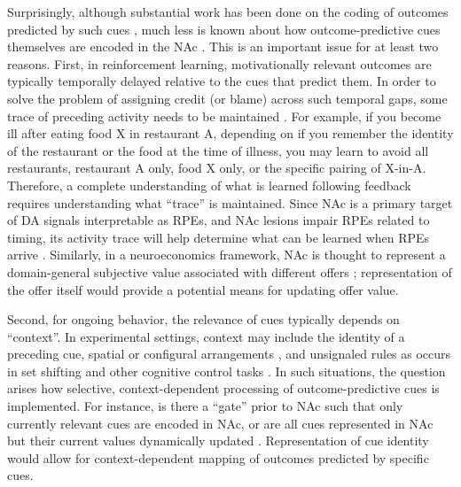 \documentclass[11pt]{article}
\let\cite=\citep
\begin{document}
Surprisingly, although substantial work has been done on the coding of
outcomes predicted by such cues
\cite{Schultz1992,Hollerman1998,Hassani2001,Cromwell2003,Setlow2003,Nicola2004,Roitman2005,Day2006,Roesch2009a,Saddoris2011,Goldstein2012,Lansink2012,Bissonette2013,McGinty2013,Atallah2014,Sugam2014,Cooch2015,West2016},
much less is known about how outcome-predictive cues themselves are
encoded in the NAc \cite[but see;][]{Sleezer2016}. This is an
important issue for at least two reasons. First, in reinforcement
learning, motivationally relevant outcomes are typically temporally
delayed relative to the cues that predict them. In order to solve the
problem of assigning credit (or blame) across such temporal gaps, some
trace of preceding activity needs to be maintained
\cite{sutton1998,Lee2012}. For example, if you become ill after eating
food X in restaurant A, depending on if you remember the identity of
the restaurant or the food at the time of illness, you may learn to
avoid all restaurants, restaurant A only, food X only, or the specific
pairing of X-in-A. Therefore, a complete understanding of what is
learned following feedback requires understanding what “trace” is
maintained. Since NAc is a primary target of DA signals interpretable
as RPEs, and NAc lesions impair RPEs related to timing, its activity
trace will help determine what can be learned when RPEs arrive
\cite{Ikemoto2007,McDannald2011,Hart2014,Hamid2016,Takahashi2016}. Similarly,
in a neuroeconomics framework, NAc is thought to represent a
domain-general subjective value associated with different offers
\cite{Peters2009,Levy2012,Bartra2013,Sescousse2015}; representation of
the offer itself would provide a potential means for updating offer
value.

Second, for ongoing behavior, the relevance of cues typically depends
on “context”. In experimental settings, context may include the
identity of a preceding cue, spatial or configural arrangements
\cite{Holland1992,Bouton1993,Honey2014}, and unsignaled rules as
occurs in set shifting and other cognitive control tasks
\cite{Grant1948,cohen1992context,Floresco2006a,Sleezer2016}. In such
situations, the question arises how selective, context-dependent
processing of outcome-predictive cues is implemented. For instance, is
there a “gate” prior to NAc such that only currently relevant cues are
encoded in NAc, or are all cues represented in NAc but their current
values dynamically updated
\cite{Goto2008,Fitzgerald2014,Sleezer2016}. Representation of cue
identity would allow for context-dependent mapping of outcomes
predicted by specific cues.
\end{document}
